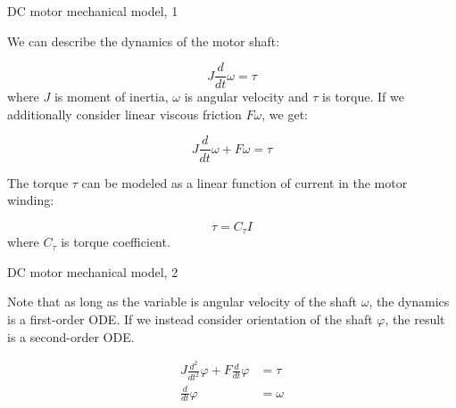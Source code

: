 \documentclass{beamer}
\begin{document}
\begin{frame}{DC motor mechanical model, 1}
	\begin{flushleft}
		
		We can describe the dynamics of the motor shaft:
		
		\begin{equation}
			J \frac{d}{dt} \omega = \tau
		\end{equation}
	where $J$ is moment of inertia, $\omega$ is angular velocity and $\tau$ is torque. If we additionally consider linear viscous friction $F \omega$, we get:
	
	\begin{equation}
		J \frac{d}{dt} \omega + F \omega = \tau
	\end{equation}

	The torque $\tau$ can be modeled as a linear function of current in the motor winding:
	 
	 \begin{equation}
	 	\tau = C_\tau I
	 \end{equation}
	 where $C_\tau$ is torque coefficient.
		
	\end{flushleft}
\end{frame}



\begin{frame}{DC motor mechanical model, 2}
	\begin{flushleft}
		
		Note that as long as the variable is angular velocity of the shaft $ \omega$, the dynamics is a first-order ODE. If we instead consider orientation of the shaft $\varphi$, the result is a second-order ODE.
		
		\begin{align}
			J \frac{d^2}{dt^2} \varphi + F \frac{d}{dt} \varphi &= \tau \\
			\frac{d}{dt} \varphi &= \omega
		\end{align}
		
	\end{flushleft}
\end{frame}
\end{document}
